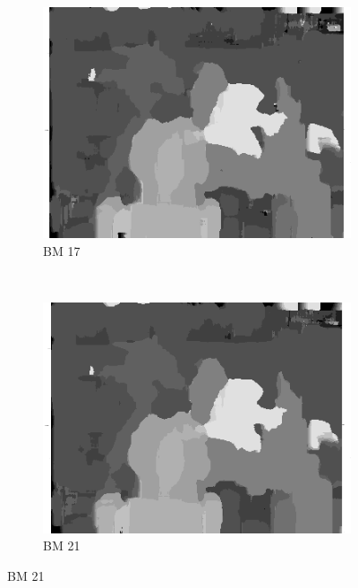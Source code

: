 \begin{figure}
\begin{subfigure}[b]{0.23\textwidth}
    \includegraphics[width=\textwidth]{images/stereo-pairs/tsukuba_bm_17.png}
    \caption{BM 17}
  \end{subfigure}
  ~
  \begin{subfigure}[b]{0.23\textwidth}
    \centering
    \includegraphics[width=\textwidth]{images/stereo-pairs/tsukuba_bm_21.png}
    \caption{BM 21}
  \end{subfigure}



\end{figure}
